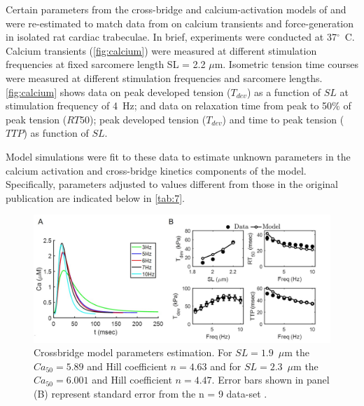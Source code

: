 \documentclass[fleqn,10pt]{physiome}
\begin{document}
Certain parameters from the cross-bridge and calcium-activation models of \cite{Tewari2016a,Tewari2016b} and \cite{Campbell2018} were re-estimated to match data from \cite{Janssen2002} on calcium transients and force-generation in isolated rat cardiac trabeculae. In brief, experiments were conducted at 37$^\circ$~C. Calcium transients (\autoref{fig:calcium}) were measured at different stimulation frequencies at fixed sarcomere length SL = 2.2 $\mu$m. Isometric tension time courses were measured at different stimulation frequencies and sarcomere lengths. \autoref{fig:calcium} shows data on peak developed tension ($T_{dev}$) as a function of $SL$ at stimulation frequency of 4~Hz; and data on relaxation time from peak to 50\% of peak tension ($RT50$); peak developed tension ($T_{dev}$) and time to peak tension ($TTP$) as function of $SL$.

Model simulations were fit to these data to estimate unknown parameters in the calcium activation and cross-bridge kinetics components of the model. Specifically, parameters adjusted to values different from those in the original publication are indicated below in \autoref{tab:7}.

\begin{figure}[ht]\centering
\includegraphics[width=1.0\linewidth]{CrossBridgeParaEstimate.jpg}
\caption{Crossbridge model parameters estimation. For $SL =1.9$~$\mu$m the $Ca_{50} = 5.89$ and Hill coefficient $n = 4.63$ and for $SL = 2.3$~$\mu$m the $Ca_{50} =6.001$ and Hill coefficient $n = 4.47$. Error bars shown in panel (B) represent standard error from the n = 9 data-set \citep{Janssen2002}.}
\label{fig:calcium}
\end{figure}
\end{document}

